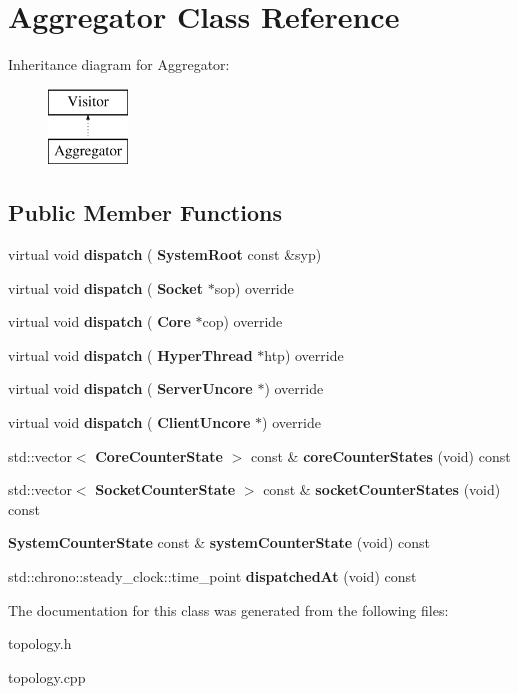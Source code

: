 \section{Aggregator Class Reference}
\label{classAggregator}
Inheritance diagram for Aggregator\+:\begin{figure}[H]
\begin{center}
\leavevmode
\includegraphics[height=2.000000cm]{classAggregator}
\end{center}
\end{figure}
\subsection*{Public Member Functions}
\begin{DoxyCompactItemize}
\item 
\mbox{\label{classAggregator_ad204fa900e5d33ff82606b6520528eb7}} 
virtual void {\bfseries dispatch} (\textbf{ System\+Root} const \&syp)
\item 
\mbox{\label{classAggregator_a85ea89febb9c4e02c04c47251445be4f}} 
virtual void {\bfseries dispatch} (\textbf{ Socket} $\ast$sop) override
\item 
\mbox{\label{classAggregator_a8bd2ccf67a0e2804d50570adf974f42b}} 
virtual void {\bfseries dispatch} (\textbf{ Core} $\ast$cop) override
\item 
\mbox{\label{classAggregator_a09b5446fe42c6567f45c8d1088c58546}} 
virtual void {\bfseries dispatch} (\textbf{ Hyper\+Thread} $\ast$htp) override
\item 
\mbox{\label{classAggregator_aef1f310caec6313125fea30beb90ae34}} 
virtual void {\bfseries dispatch} (\textbf{ Server\+Uncore} $\ast$) override
\item 
\mbox{\label{classAggregator_a38765b88f36922d3f3e7e9ef86c16384}} 
virtual void {\bfseries dispatch} (\textbf{ Client\+Uncore} $\ast$) override
\item 
\mbox{\label{classAggregator_af295e99c6741d4f49ad0c9778ae5a401}} 
std\+::vector$<$ \textbf{ Core\+Counter\+State} $>$ const  \& {\bfseries core\+Counter\+States} (void) const
\item 
\mbox{\label{classAggregator_a8578a4a1074927a24e6954c195b77c3b}} 
std\+::vector$<$ \textbf{ Socket\+Counter\+State} $>$ const  \& {\bfseries socket\+Counter\+States} (void) const
\item 
\mbox{\label{classAggregator_ab294f32eadbea1ad94fc2dfaac21a989}} 
\textbf{ System\+Counter\+State} const  \& {\bfseries system\+Counter\+State} (void) const
\item 
\mbox{\label{classAggregator_a163e952301b1f9c7c645c080928a210c}} 
std\+::chrono\+::steady\+\_\+clock\+::time\+\_\+point {\bfseries dispatched\+At} (void) const
\end{DoxyCompactItemize}


The documentation for this class was generated from the following files\+:\begin{DoxyCompactItemize}
\item 
topology.\+h\item 
topology.\+cpp\end{DoxyCompactItemize}
